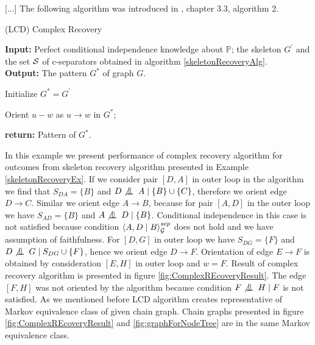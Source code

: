 %
%

[...] The following algorithm was introduced in \cite{CG}, chapter 3.3, algorithm 2.

\begin{algorithm}
	\caption{(LCD) Complex Recovery}\label{complexRecoveryAlg}
	
	\textbf{Input:} Perfect conditional independence knowledge about $\mathbb{P}$; the skeleton $G^{'}$ and the set 
					$\mathcal{S}$ of c-separators obtained in algorithm \ref{skeletonRecoveryAlg}.  \\
	\textbf{Output:} The pattern $G^{*}$ of graph $G$.

	
	\begin{algorithmic}[1]
			\State Initialize $G^{*} = G^{'}$ 
	
						\State Orient $u - w$ as $u \rightarrow w$ in $G^{*}$;
					\EndIf
				\EndFor
			\EndFor			
			
			\State \textbf{return:} Pattern of $G^{*}$.
		\EndProcedure
	\end{algorithmic}
\end{algorithm}


\begin{ex}
	In this example we present performance of complex recovery algorithm for outcomes from skeleton recovery
	algorithm presented in Example \ref{skeletonRecoveryEx}. If we consider pair $[D, A]$ in outer loop in
	the algorithm we find that $S_{DA} = \{ B \}$ and $D \not \bigCI A \mid \{ B \} \cup \{ C \}$, therefore 
	we orient edge $D \rightarrow C$. Similar we orient edge $A \rightarrow B$, because for pair $[A, D]$ in
	the outer loop we have $S_{AD} = \{ B \}$ and $A \not \bigCI D \mid \{ B \} $. Conditional independence 
	in this case is not satisfied because condition $\left\langle A , D \mid B \right\rangle_{\mathcal{G}}^{sep}$ does not hold and we have assumption
	of faithfulness. For $[D, G]$ in outer loop we have $S_{DG} = \{ F\}$ and 
	$D \not \bigCI G \mid S_{DG} \cup \{ F \}$, hence we orient edge $D \rightarrow F$. Orientation of edge 
	$E \rightarrow F$ is obtained by consideration $[E, H]$ in outer loop and $w = F$. Result of complex
	recovery algorithm is presented in figure \ref{fig:ComplexREcoveryResult}. The edge $[F, H]$ was not oriented
	by the algorithm because condition $F \not\bigCI H \mid F$ is not satisfied. As we mentioned before 
	LCD algorithm creates representative of Markov equivalence class of given chain graph. 
	Chain graphs presented in figure \ref{fig:ComplexREcoveryResult} and \ref{fig:graphForNodeTree} are in the
	same Markov equivalence class.  
\end{ex}



